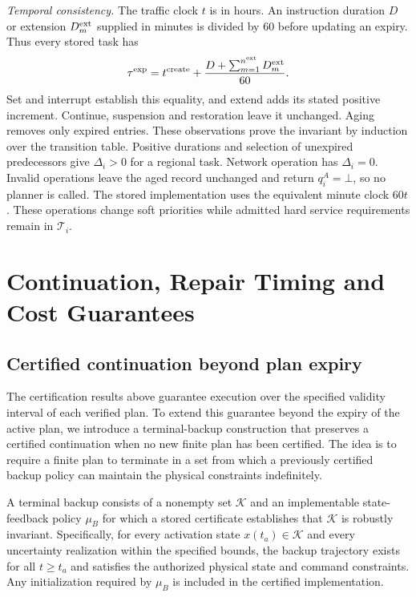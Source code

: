 \documentclass[preprint,12pt]{elsarticle}
\begin{document}
\emph{Temporal consistency.} The traffic clock $t$ is in hours.
An instruction duration $D$ or extension $D_m^{\rm ext}$ supplied in
minutes is divided by 60 before updating an expiry. Thus every stored task
has
\begin{equation}
\tau^{\rm exp}=t^{\rm create}
 +\frac{D+\sum_{m=1}^{n^{\rm ext}}D_m^{\rm ext}}{60}.
\label{eq:task-expiry-invariant}
\end{equation}
Set and interrupt establish this equality, and extend adds its stated positive
increment. Continue, suspension and restoration leave it unchanged.
Aging removes only expired entries. These observations prove the invariant
by induction over the transition table. Positive durations and selection
of unexpired predecessors give $\Delta_i>0$ for a regional task. Network
operation has $\Delta_i=0$. Invalid operations leave the aged record
unchanged and return $q_i^A=\bot$, so no planner is called. The stored
implementation uses the equivalent minute clock $60t$. These operations
change soft priorities while admitted hard service requirements remain in
$\mathcal T_i$.

\section{Continuation, Repair Timing and Cost Guarantees}
\label{app:repair-cost}

\subsection{Certified continuation beyond plan expiry}
\label{sec:terminal-backup}

The certification results above guarantee execution over the specified validity
interval of each verified plan. To extend this guarantee beyond the expiry of
the active plan, we introduce a terminal-backup construction that preserves a
certified continuation when no new finite plan has been certified. The idea is
to require a finite plan to terminate in a set from which a previously
certified backup policy can maintain the physical constraints indefinitely.

A terminal backup consists of a nonempty set $\mathcal K$ and an implementable
state-feedback policy $\mu_B$ for which a stored certificate establishes that
$\mathcal K$ is robustly invariant. Specifically, for every activation state
$x(t_a)\in\mathcal K$ and every uncertainty realization within the specified
bounds, the backup trajectory exists for all $t\ge t_a$ and satisfies the
authorized physical state and command constraints. Any initialization required by $\mu_B$ is included in the certified
implementation.
\end{document}
